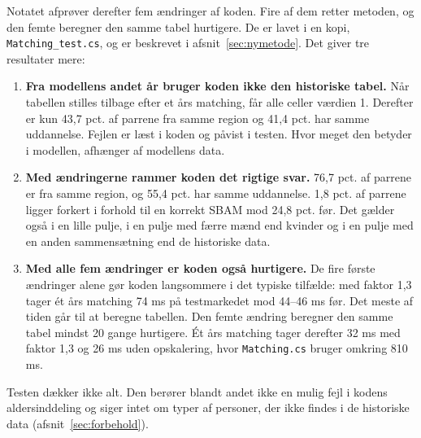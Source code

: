 \documentclass[11pt,a4paper]{article}
\newcommand{\kode}[1]{\texttt{#1}}
\begin{document}
Notatet afprøver derefter fem ændringer af koden. Fire af dem retter metoden, og den femte beregner
den samme tabel hurtigere. De er lavet i en kopi, \kode{Matching\_test.cs}, og er beskrevet i
afsnit~\ref{sec:nymetode}. Det giver tre resultater mere:

\begin{enumerate}[resume]
\item \textbf{Fra modellens andet år bruger koden ikke den historiske tabel.} Når tabellen stilles
tilbage efter et års matching, får alle celler værdien 1. Derefter er kun 43,7 pct. af parrene fra
samme region og 41,4 pct. har samme uddannelse. Fejlen er læst i koden og påvist i testen. Hvor
meget den betyder i modellen, afhænger af modellens data.

\item \textbf{Med ændringerne rammer koden det rigtige svar.} 76,7 pct. af parrene er fra samme
region, og 55,4 pct. har samme uddannelse. 1,8 pct. af parrene ligger forkert i forhold til en
korrekt SBAM mod 24,8 pct. før. Det gælder også i en lille pulje, i en pulje med færre mænd end
kvinder og i en pulje med en anden sammensætning end de historiske data.

\item \textbf{Med alle fem ændringer er koden også hurtigere.} De fire første ændringer alene gør
koden langsommere i det typiske tilfælde: med faktor 1,3 tager ét års matching 74 ms på testmarkedet
mod 44--46 ms før. Det meste af tiden går til at beregne tabellen. Den femte ændring beregner den
samme tabel mindst 20 gange hurtigere. Ét års matching tager derefter 32 ms med faktor 1,3 og 26 ms
uden opskalering, hvor \kode{Matching.cs} bruger omkring 810 ms.
\end{enumerate}

Testen dækker ikke alt. Den berører blandt andet ikke en mulig fejl i kodens aldersinddeling og siger
intet om typer af personer, der ikke findes i de historiske data (afsnit~\ref{sec:forbehold}).
\end{document}
